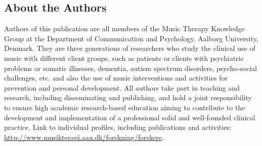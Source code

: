     \fadebreak{}
\subsection{About the Authors}
\label{paper2:colophon}

Authors of this publication are all members of the Music Therapy Knowledge Group at the Department of Communication and Psychology, Aalborg University, Denmark. They are three generations of researchers who study the clinical use of music with different client groups, such as patients or clients with psychiatric problems or somatic illnesses, dementia, autism spectrum disorders, psycho-social challenges, etc. and also the use of music interventions and activities for prevention and personal development. All authors take part in teaching and research, including disseminating and publishing, and hold a joint responsibility to ensure high academic research-based education aiming to contribute to the development and implementation of a professional solid and well-founded clinical practice.
Link to individual profiles, including publications and activities: \url{http://www.musikterapi.aau.dk/forskning/forskere}.
